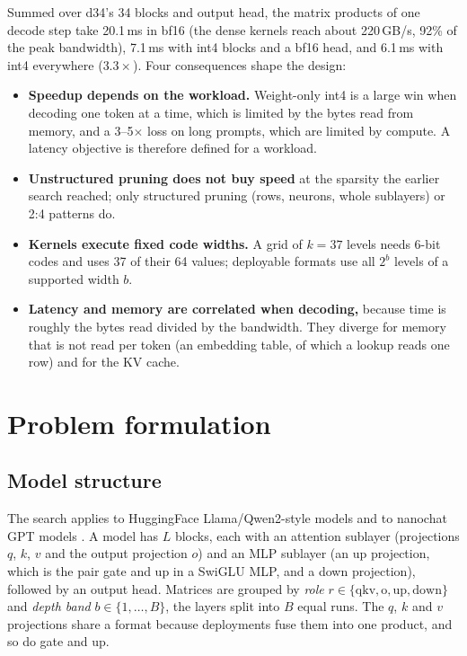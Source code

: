 \documentclass[11pt]{article}
\begin{document}
\noindent Summed over d34's 34 blocks and output head, the matrix products of one decode step take
20.1\,ms in bf16 (the dense kernels reach about 220\,GB/s, 92\% of the peak bandwidth), 7.1\,ms with
int4 blocks and a bf16 head, and 6.1\,ms with int4 everywhere ($3.3\times$). Four consequences shape the
design:
\begin{itemize}
  \item \textbf{Speedup depends on the workload.} Weight-only int4 is a large win when decoding one
        token at a time, which is limited by the bytes read from memory, and a 3--5$\times$ loss on long
        prompts, which are limited by compute. A latency objective is therefore defined for a workload.
  \item \textbf{Unstructured pruning does not buy speed} at the sparsity the earlier search reached;
        only structured pruning (rows, neurons, whole sublayers) or 2:4 patterns do.
  \item \textbf{Kernels execute fixed code widths.} A grid of $k=37$ levels needs 6-bit codes and uses
        37 of their 64 values; deployable formats use all $2^b$ levels of a supported width $b$.
  \item \textbf{Latency and memory are correlated when decoding,} because time is roughly the bytes
        read divided by the bandwidth. They diverge for memory that is not read per token (an embedding
        table, of which a lookup reads one row) and for the KV cache.
\end{itemize}

\section{Problem formulation}
\label{sec:formulation}

\subsection{Model structure}
The search applies to HuggingFace Llama/Qwen2-style models and to nanochat GPT models
\cite{karpathy2025nanochat}. A model has $L$ blocks, each with an attention sublayer (projections $q$,
$k$, $v$ and the output projection $o$) and an MLP sublayer (an up projection, which is the pair gate and
up in a SwiGLU MLP, and a down projection), followed by an output head. Matrices are grouped by
\emph{role} $r\in\{\text{qkv},\text{o},\text{up},\text{down}\}$ and \emph{depth band}
$b\in\{1,\dots,B\}$, the layers split into $B$ equal runs. The $q$, $k$ and $v$ projections share a
format because deployments fuse them into one product, and so do gate and up.
\end{document}
